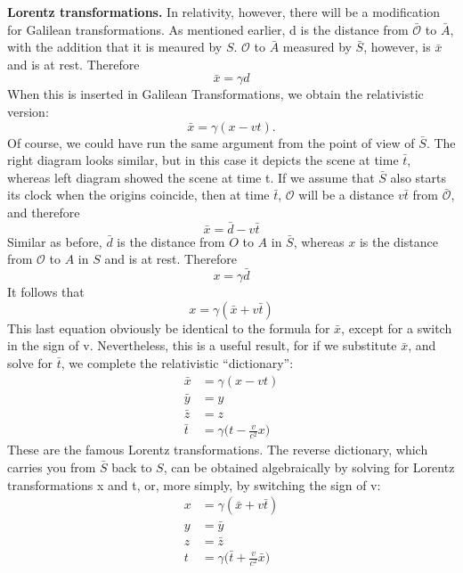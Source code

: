 \documentclass[../main.tex]{subfiles}
\begin{document}
\textbf{Lorentz transformations.} In relativity, however, there will be a modification for Galilean transformations. As mentioned earlier, d is the distance from $\bar{\mathcal{O}}$ to $\bar{A}$, with the addition that it is meaured by $S$. $ {\mathcal{O}}$ to $\bar{A}$ measured by $\bar{S}$, however, is $\bar{x}$ and is at rest. Therefore
\begin{equation*}
    \bar{x}=\gamma d
\end{equation*}
When this is inserted in Galilean Transformations, we obtain the relativistic version:
\begin{equation*}
    \bar{x} = \gamma (x - vt).
\end{equation*}
Of course, we could have run the same argument from the point of view of $\bar{S}$. The right diagram looks similar, but in this case it depicts the scene at time $\bar{t}$, whereas left diagram showed the scene at time t. If we assume that $\bar{S}$ also starts its clock when the origins coincide, then at time $\bar{t}$, $\mathcal{O}$ will be a distance $v\bar{t}$ from $\bar{\mathcal{O}}$, and therefore
\begin{equation*}
    \bar{x}=\bar{d}-v\bar{t}
\end{equation*}
Similar as before, $\bar{d}$ is the distance from $O$ to $A$ in $\bar{S}$, whereas $x$ is the distance from $\mathcal{O}$ to $A$ in $S$ and is at rest. Therefore
\begin{equation*}
    x=\gamma\bar{d}
\end{equation*}
It follows that
\begin{equation*}
    x=\gamma(\bar{x}+v\bar{t})
\end{equation*}
This last equation obviously be identical to the formula for $\bar{x}$, except for a switch in the sign of v. Nevertheless, this is a useful result, for if we substitute $\bar{x}$, and solve for $\bar{t}$, we complete the relativistic “dictionary”:
\begin{align*}
    \bar{x} &= \gamma (x - vt)\\
    \bar{y} &= y\\
    \bar{z} &= z\\
    \bar{t}&=\gamma\biggl(t-\frac{v}{c^2}x\biggr)
\end{align*}
These are the famous Lorentz transformations. The reverse dictionary, which carries you from $\bar{S}$ back to $S$, can be obtained algebraically by solving for Lorentz transformations x and t, or, more simply, by switching the sign of v:
\begin{align*}
    x &= \gamma (\bar{x}+ v\bar{t})\\
    y &= \bar{y}\\
    z &= \bar{z}\\
    t&=\gamma\biggl(\bar{t}+ \frac{v}{c^2}\bar{x}\biggr)
\end{align*}
\end{document}
